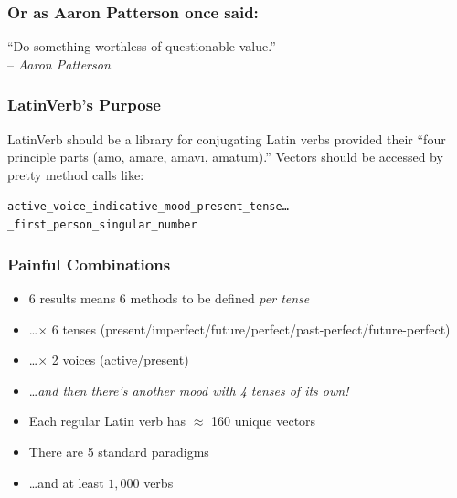 \documentclass[slidestop,compress,mathserif]{beamer}
\begin{document}
\begin{frame}
	\frametitle{Or as Aaron Patterson once said:}
	\begin{center}
		``Do something worthless of questionable value.'' \\ -- \emph{Aaron Patterson}
	\end{center}
\end{frame}


\begin{frame}
	\frametitle{LatinVerb's Purpose}
	LatinVerb should be a library for conjugating Latin verbs provided their ``four principle parts (am\={o}, am\={a}re, am\={a}v\={\i}, amatum).''
	\pause
	\vskip 0.5cm
	Vectors should be accessed by pretty method calls like:
	\vskip 0.5cm

	\texttt{active\_voice\_indicative\_mood\_present\_tense{\ldots}\\
	\_first\_person\_singular\_number}

\end{frame}

\begin{frame}
	\frametitle{Painful Combinations}
	\begin{itemize}
		\item 6 results means 6 methods to be defined \emph{per tense}
		\pause
		\item \ldots $\times$ 6 tenses (present/imperfect/future/perfect/past-perfect/future-perfect)
		\pause
		\item \ldots $\times$ 2 voices (active/present)
		\pause
		\item \ldots \emph{and then there's another mood with 4 tenses of its own!}
		\pause
		\item Each regular Latin verb has $\approx$  160 unique vectors
		\pause
		\item There are 5 standard paradigms
		\pause
		\item \ldots and at least $1,000$ verbs
	\end{itemize}
\end{frame}
\end{document}
